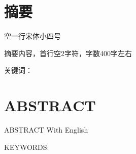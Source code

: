 \documentclass[UTF8，a4paper]{ctexrep}
\begin{document}

\chapter*{摘\qquad 要}{\heiti{}}
空一行宋体小四号

\noindent
\qquad 摘要内容，首行空2字符，字数400字左右


\noindent
关键词：
\clearpage

\chapter*{\textbf{ABSTRACT}}{\bf}

\qquad  ABSTRACT With English

KEYWORDS:
\newpage
\renewcommand{\cftdot}{$\cdot$}
\renewcommand{\cftdotsep}{1.5}
\setlength{\cftbeforechapskip}{10pt}

\renewcommand{\cftchapleader}{\cftdotfill{\cftchapdotsep}}
\renewcommand{\cftchapdotsep}{\cftdotsep}
\makeatletter
\renewcommand{\numberline}[1]{%
\settowidth\@tempdimb{#1\hspace{0.5em}}%
\ifdim\@tempdima<\@tempdimb%
  \@tempdima=\@tempdimb%
\fi%
\hb@xt@\@tempdima{\@cftbsnum #1\@cftasnum\hfil}\@cftasnumb}
\makeatother
\renewcommand\contentsname{目\qquad 录}
\tableofcontents


\clearpage
{}
\end{document}
